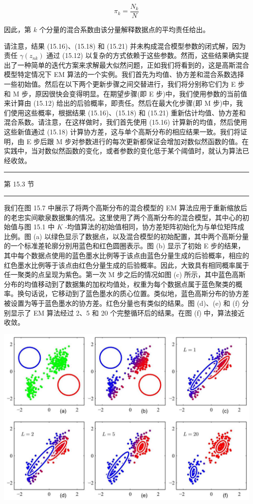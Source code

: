 \documentclass[10pt]{report}
\newcommand{\HRule}{\begin{center}\rule{0.9\linewidth}{0.2mm}\end{center}}
\begin{document}
\[
{\pi }_{k} = \frac{{N}_{k}}{N} \tag{15.21}
\]

因此，第 \(k\) 个分量的混合系数由该分量解释数据点的平均责任给出。

请注意，结果 (15.16)、(15.18) 和 (15.21) 并未构成混合模型参数的闭式解，因为责任 \(\gamma \left( {z}_{nk}\right)\) 通过 (15.12) 以复杂的方式依赖于这些参数。然而，这些结果确实提出了一种简单的迭代方案来求解最大似然问题，正如我们将看到的，这是高斯混合模型特定情况下 EM 算法的一个实例。我们首先为均值、协方差和混合系数选择一些初始值。然后在以下两个更新步骤之间交替进行，我们将分别称它们为 E 步和 M 步，原因很快会变得明显。在期望步骤(即 E 步)中，我们使用参数的当前值来计算由 (15.12) 给出的后验概率，即责任。然后在最大化步骤(即 M 步)中，我们使用这些概率，根据结果 (15.16)、(15.18) 和 (15.21) 重新估计均值、协方差和混合系数。请注意，在这样做时，我们首先使用 (15.16) 计算新的均值，然后使用这些新值通过 (15.18) 计算协方差，这与单个高斯分布的相应结果一致。我们将证明，由 E 步后跟 M 步对参数进行的每次更新都保证会增加对数似然函数的值。在实践中，当对数似然函数的变化，或者参数的变化低于某个阈值时，就认为算法已经收敛。

\HRule

第 15.3 节

\HRule

我们在图 15.7 中展示了将两个高斯分布的混合模型的 EM 算法应用于重新缩放后的老忠实间歇泉数据集的情况。这里使用了两个高斯分布的混合模型，其中心的初始值与图 15.1 中 \(K\) -均值算法的初始值相同，协方差矩阵初始化为与单位矩阵成比例。图 (a) 以绿色显示了数据点，以及混合模型的初始配置，其中两个高斯分量的一个标准差轮廓分别用蓝色和红色圆圈表示。图 (b) 显示了初始 E 步的结果，其中每个数据点使用的蓝色墨水比例等于该点由蓝色分量生成的后验概率，相应的红色墨水比例等于该点由红色分量生成的后验概率。因此，大致具有相同概率属于任一聚类的点呈现为紫色。第一次 \(\mathrm{M}\) 步之后的情况如图 (c) 所示，其中蓝色高斯分布的均值移动到了数据集的加权均值处，权重为每个数据点属于蓝色聚类的概率。换句话说，它移动到了蓝色墨水的质心位置。类似地，蓝色高斯分布的协方差被设置为等于蓝色墨水的协方差。红色分量也有类似的结果。图 (d)、(e) 和 (f) 分别显示了 EM 算法经过 2、5 和 20 个完整循环后的结果。在图 (f) 中，算法接近收敛。

\begin{center}
\includegraphics[max width=1.0\textwidth]{images/0194e279-9b28-703a-88f4-c3ac21e2010d_492_248_351_1300_882_0.jpg}
\end{center}
\hspace*{3em} 
\end{document}
